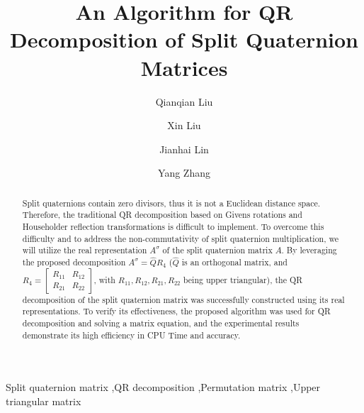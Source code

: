 \documentclass[preprint,12pt]{elsarticle}
\numberwithin{equation}{section}
\begin{document}
\begin{frontmatter}

\title{An Algorithm for QR Decomposition of Split Quaternion Matrices}

\author[inst1]{Qianqian Liu}
\author[inst1]{Xin Liu}
\author[inst1]{Jianhai Lin}
\author[inst2]{Yang Zhang}


\address[inst1]{Faculty of Innovation Engineering, Macau University of Science and Technology, Avenida Wai Long, TaiPa, Macau, 999078, P. R. China}
\address[inst2]{Department of Mathematics, University of Manitoba, Winnipeg, MB, R3T 2N2, Canada}

\begin{abstract}
Split quaternions contain zero divisors, thus it is not a Euclidean distance space. Therefore, the traditional QR decomposition based on Givens rotations and Householder reflection transformations is difficult to implement. To overcome this difficulty and to address the non-commutativity of split quaternion multiplication, we will utilize the real representation $A^\sigma$ of the split quaternion matrix $A$.  By leveraging the proposed decomposition $A^\sigma = \hat{Q}R_4$  ($\hat{Q}$ is an orthogonal matrix, and $R_4 = \begin{bmatrix} R_{11} & R_{12} \\ R_{21} & R_{22} \end{bmatrix}$, with $R_{11}, R_{12}, R_{21}, R_{22}$ being upper triangular), the QR decomposition of the split quaternion matrix was successfully constructed using its real representations. To verify its effectiveness, the proposed algorithm was used for QR decomposition and solving a matrix equation, and the experimental results demonstrate its high efficiency in CPU Time and accuracy.
\end{abstract}

\begin{keyword}
Split quaternion matrix \sep QR decomposition \sep Permutation matrix \sep Upper triangular matrix
\end{keyword}

\end{frontmatter}
\end{document}
